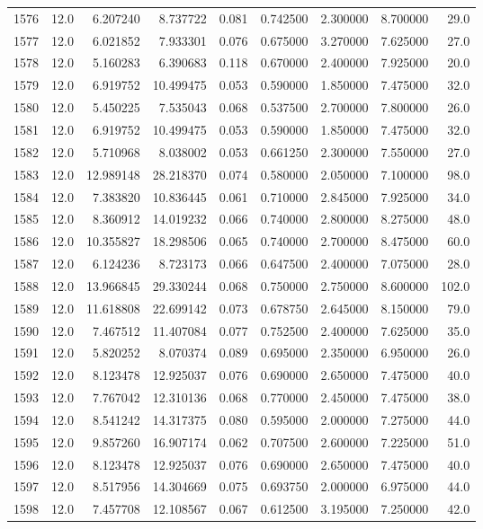 \begin{tabular}{lrrrrrrrr}
1576 &   12.0 &   6.207240 &   8.737722 &  0.081 &  0.742500 &  2.300000 &   8.700000 &   29.0 \\
1577 &   12.0 &   6.021852 &   7.933301 &  0.076 &  0.675000 &  3.270000 &   7.625000 &   27.0 \\
1578 &   12.0 &   5.160283 &   6.390683 &  0.118 &  0.670000 &  2.400000 &   7.925000 &   20.0 \\
1579 &   12.0 &   6.919752 &  10.499475 &  0.053 &  0.590000 &  1.850000 &   7.475000 &   32.0 \\
1580 &   12.0 &   5.450225 &   7.535043 &  0.068 &  0.537500 &  2.700000 &   7.800000 &   26.0 \\
1581 &   12.0 &   6.919752 &  10.499475 &  0.053 &  0.590000 &  1.850000 &   7.475000 &   32.0 \\
1582 &   12.0 &   5.710968 &   8.038002 &  0.053 &  0.661250 &  2.300000 &   7.550000 &   27.0 \\
1583 &   12.0 &  12.989148 &  28.218370 &  0.074 &  0.580000 &  2.050000 &   7.100000 &   98.0 \\
1584 &   12.0 &   7.383820 &  10.836445 &  0.061 &  0.710000 &  2.845000 &   7.925000 &   34.0 \\
1585 &   12.0 &   8.360912 &  14.019232 &  0.066 &  0.740000 &  2.800000 &   8.275000 &   48.0 \\
1586 &   12.0 &  10.355827 &  18.298506 &  0.065 &  0.740000 &  2.700000 &   8.475000 &   60.0 \\
1587 &   12.0 &   6.124236 &   8.723173 &  0.066 &  0.647500 &  2.400000 &   7.075000 &   28.0 \\
1588 &   12.0 &  13.966845 &  29.330244 &  0.068 &  0.750000 &  2.750000 &   8.600000 &  102.0 \\
1589 &   12.0 &  11.618808 &  22.699142 &  0.073 &  0.678750 &  2.645000 &   8.150000 &   79.0 \\
1590 &   12.0 &   7.467512 &  11.407084 &  0.077 &  0.752500 &  2.400000 &   7.625000 &   35.0 \\
1591 &   12.0 &   5.820252 &   8.070374 &  0.089 &  0.695000 &  2.350000 &   6.950000 &   26.0 \\
1592 &   12.0 &   8.123478 &  12.925037 &  0.076 &  0.690000 &  2.650000 &   7.475000 &   40.0 \\
1593 &   12.0 &   7.767042 &  12.310136 &  0.068 &  0.770000 &  2.450000 &   7.475000 &   38.0 \\
1594 &   12.0 &   8.541242 &  14.317375 &  0.080 &  0.595000 &  2.000000 &   7.275000 &   44.0 \\
1595 &   12.0 &   9.857260 &  16.907174 &  0.062 &  0.707500 &  2.600000 &   7.225000 &   51.0 \\
1596 &   12.0 &   8.123478 &  12.925037 &  0.076 &  0.690000 &  2.650000 &   7.475000 &   40.0 \\
1597 &   12.0 &   8.517956 &  14.304669 &  0.075 &  0.693750 &  2.000000 &   6.975000 &   44.0 \\
1598 &   12.0 &   7.457708 &  12.108567 &  0.067 &  0.612500 &  3.195000 &   7.250000 &   42.0 \\
\bottomrule
\end{tabular}
